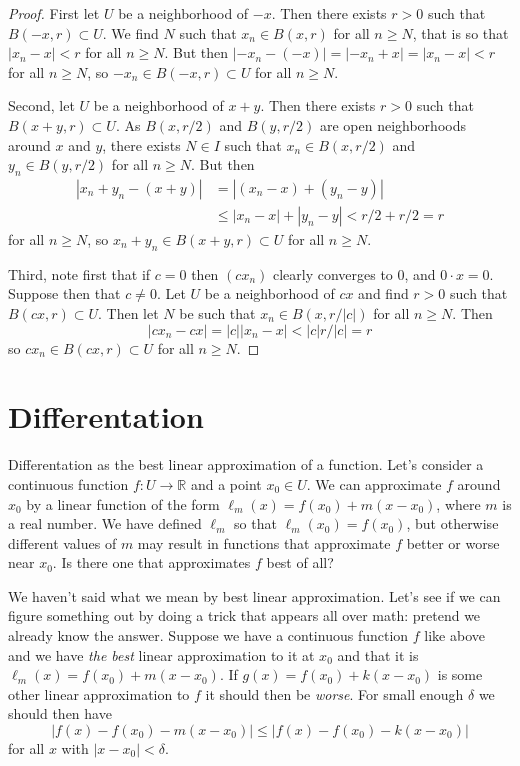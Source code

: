 \documentclass[11pt]{article}
\theoremstyle{definition}
\newcommand{\kk}[1]{\mathbb{#1}}
\begin{document}
\begin{proof}
First let $U$ be a neighborhood of $-x$.
Then there exists $r > 0$ such that $B(-x,r) \subset U$.
We find $N$ such that $x_n \in B(x,r)$ for all $n \geq N$,
that is so that $|x_n - x| < r$ for all $n \geq N$.
But then $|-x_n - (-x)| = |-x_n + x| = |x_n - x| < r$ for all $n \geq N$,
so $-x_n \in B(-x,r) \subset U$ for all $n \geq N$.


Second, let $U$ be a neighborhood of $x + y$.
Then there exists $r > 0$ such that $B(x+y, r) \subset U$.
As $B(x, r/2)$ and $B(y, r/2)$ are open neighborhoods around $x$ and $y$,
there exists $N \in I$ such that $x_n \in B(x, r/2)$ and $y_n \in B(y, r/2)$
for all $n \geq N$.
But then
\begin{align*}
| x_n + y_n - (x + y) |
&= | (x_n - x) + (y_n - y) |
\\
&\leq |x_n - x| + |y_n - y|
< r/2 + r/2 = r
\end{align*}
for all $n \geq N$, so $x_n + y_n \in B(x+y,r) \subset U$ for all $n \geq N$.


Third, note first that if $c = 0$ then $(c x_n)$ clearly converges to $0$, and
$0 \cdot x = 0$. Suppose then that $c \not= 0$. Let $U$ be a neighborhood of
$cx$ and find $r > 0$ such that $B(cx,r) \subset U$. Then let $N$ be such
that $x_n \in B(x,r/|c|)$ for all $n \geq N$.
Then
\[
|cx_n - cx| = |c| |x_n - x| < |c| r /|c| = r
\]
so $cx_n \in B(cx,r) \subset U$ for all $n \geq N$.
\end{proof}


\section{Differentation}

Differentation as the best linear approximation of a function.
Let's consider a continuous function $f : U \to \kk R$ and a point $x_0 \in U$.
We can approximate $f$ around $x_0$ by a linear function of the form $\ell_m(x)
= f(x_0) + m (x - x_0)$, where $m$ is a real number. We have defined $\ell_m$
so that $\ell_m(x_0) = f(x_0)$, but otherwise different values of $m$ may
result in functions that approximate $f$ better or worse near $x_0$.
Is there one that approximates $f$ best of all?

We haven't said what we mean by best linear approximation.
Let's see if we can figure something out by doing a trick that appears all over
math: pretend we already know the answer.
Suppose we have a continuous function $f$ like above
and we have \emph{the best} linear approximation to it at $x_0$ and that
it is $\ell_m(x) = f(x_0) + m(x - x_0)$.
If $g(x) = f(x_0) + k(x - x_0)$ is some other linear approximation to $f$ it
should then be \emph{worse}.
For small enough $\delta$ we should then have
$$
|f(x) - f(x_0) - m(x - x_0)|
\leq |f(x) - f(x_0) - k(x - x_0)|
$$
for all $x$ with $|x - x_0| < \delta$.
\end{document}

